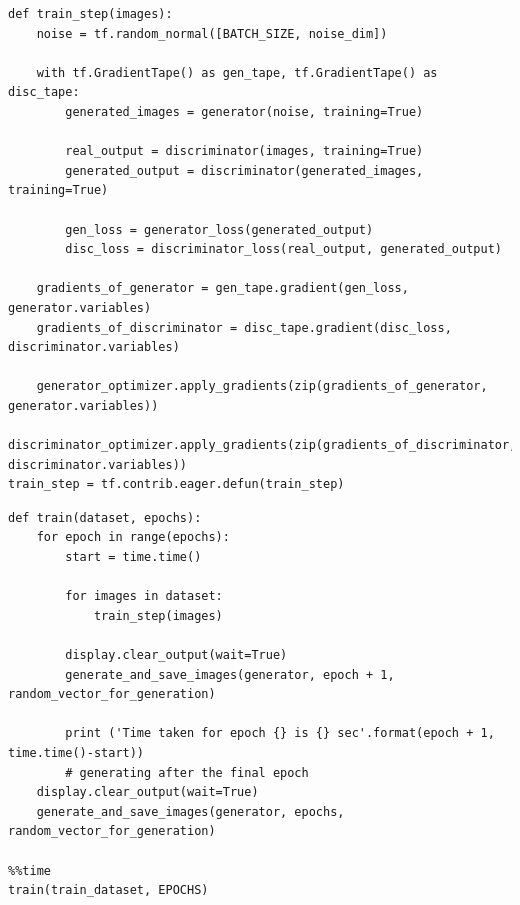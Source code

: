 \documentclass[a4paper, 12pt]{article}
\begin{document}
\begin{lstlisting}[style=myPython,caption={设置训练步骤}]
def train_step(images):
    noise = tf.random_normal([BATCH_SIZE, noise_dim])
      
    with tf.GradientTape() as gen_tape, tf.GradientTape() as disc_tape:
        generated_images = generator(noise, training=True)

        real_output = discriminator(images, training=True)
        generated_output = discriminator(generated_images, training=True)
        
        gen_loss = generator_loss(generated_output)
        disc_loss = discriminator_loss(real_output, generated_output)
        
    gradients_of_generator = gen_tape.gradient(gen_loss, generator.variables)
    gradients_of_discriminator = disc_tape.gradient(disc_loss, discriminator.variables)
      
    generator_optimizer.apply_gradients(zip(gradients_of_generator, generator.variables))
    discriminator_optimizer.apply_gradients(zip(gradients_of_discriminator, discriminator.variables))
train_step = tf.contrib.eager.defun(train_step)
\end{lstlisting}

\begin{lstlisting}[style=myPython,caption={完整训练过程}]
def train(dataset, epochs):  
    for epoch in range(epochs):
        start = time.time()
    
        for images in dataset:
            train_step(images)

        display.clear_output(wait=True)
        generate_and_save_images(generator, epoch + 1, random_vector_for_generation)
    
        print ('Time taken for epoch {} is {} sec'.format(epoch + 1, time.time()-start))
        # generating after the final epoch
    display.clear_output(wait=True)
    generate_and_save_images(generator, epochs, random_vector_for_generation)

%%time
train(train_dataset, EPOCHS)
\end{lstlisting}
\end{document}
